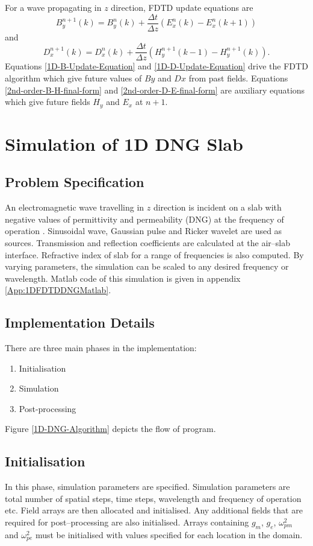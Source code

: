 For a wave propagating in $z$ direction, FDTD update equations are
\begin{equation}
B^{n+1}_y(k)=B^n_y(k)+\dfrac{\Delta t}{\Delta z}\left(E^n_x(k)-E^n_x(k+1)\right)
\label{1D-B-Update-Equation}
\end{equation}
and
\begin{equation}
D^{n+1}_x(k)=D^n_x(k)+\dfrac{\Delta t}{\Delta z}\left(H^{n+1}_y(k-1)-H^{n+1}_y(k)\right).
\label{1D-D-Update-Equation}
\end{equation}
Equations \ref{1D-B-Update-Equation} and \ref{1D-D-Update-Equation} drive the FDTD algorithm which give future values of $By$ and $Dx$ from past fields. Equations \ref{2nd-order-B-H-final-form} and \ref{2nd-order-D-E-final-form} are auxiliary equations which give future fields $H_y$ and $E_x$ at $n+1$.
\section{Simulation of 1D DNG Slab}
\subsection{Problem Specification}
An electromagnetic wave travelling in $z$ direction is incident on a slab with negative values of permittivity and permeability (DNG) at the frequency of operation \cite{DNG-Ehud-Ziol}. Sinusoidal wave, Gaussian pulse and Ricker wavelet are used as sources. Transmission and reflection coefficients are calculated at the air--slab interface. Refractive index of slab for a range of frequencies is also computed. By varying parameters, the simulation can be scaled to any desired frequency or wavelength. Matlab code of this simulation is given in appendix \ref{App:1DFDTDDNGMatlab}.
\subsection{Implementation Details}
There are three main phases in the implementation:
\begin{enumerate}
\item Initialisation
\item Simulation
\item Post-processing
\end{enumerate}
Figure \ref{1D-DNG-Algorithm} depicts the flow of program.
\subsection{Initialisation}
In this phase, simulation parameters are specified. Simulation parameters are total number of spatial steps, time steps, wavelength and frequency of operation etc. Field arrays are then allocated and initialised. Any additional fields that are required for post--processing are also initialised. Arrays containing $g_m$, $g_e$, $\omega^2_{pm}$ and $\omega^2_{pe}$ must be initialised with values specified for each location in the domain.
